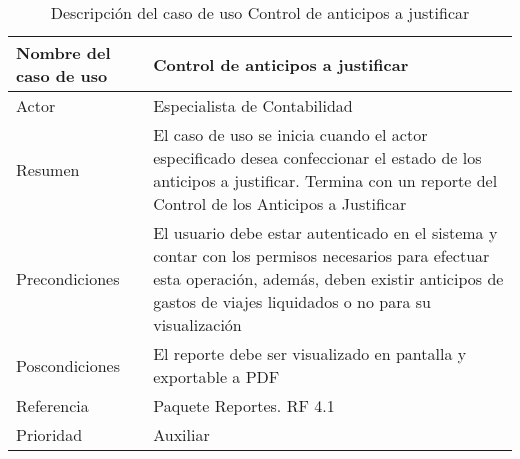\begin{table}[H]
	\sf
	\begin{supertabular}{|p{4.5cm}|p{12cm}|}
		\hline
		\textbf{Nombre del caso de uso}
		& \textbf{Control de anticipos a justificar} \\ \hline
		
		Actor
		& Especialista de Contabilidad \\ \hline
		
		Resumen
		& El caso de uso se inicia cuando el actor especificado desea confeccionar el estado de los anticipos a justificar. Termina con un reporte del Control de los Anticipos a Justificar \\ \hline
		
		Precondiciones
		& El usuario debe estar autenticado en el sistema y contar con los permisos necesarios para efectuar esta operación, además, deben existir anticipos de gastos de viajes liquidados o no para su visualización \\ \hline
		
		Poscondiciones
		& El reporte debe ser visualizado en pantalla y exportable a PDF \\ \hline
		
		Referencia
		& Paquete Reportes. RF 4.1 \\ \hline
		
		Prioridad
		& Auxiliar \\		
		\hline
	\end{supertabular}
	\caption[Descripción del caso de uso Control de anticipos a justificar]{Descripción del caso de uso Control de anticipos a justificar}
	\label{table:CU_ContAntic}
\end{table}

